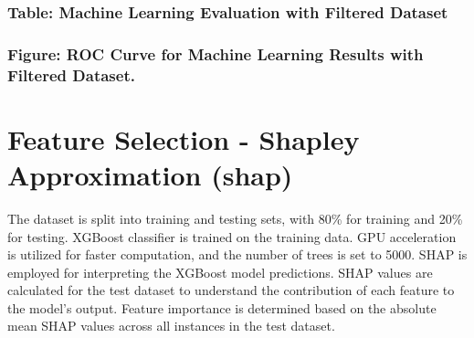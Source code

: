 \documentclass[letterpaper]{article}
\begin{document}
\subsubsection[Table: Machine Learning Evaluation with Filtered Dataset]{\textbf{Table:} Machine Learning Evaluation
with Filtered Dataset}
\centering
{}
\par

\bigskip

\subsubsection[Figure: ROC Curve for Machine Learning Results with Filtered Dataset.]{\textbf{Figure:} ROC Curve for
Machine Learning Results with Filtered Dataset.}

\bigskip


\bigskip


\bigskip


\bigskip


\bigskip


\bigskip

\section[Feature Selection {}- Shapley Approximation (shap)]{\textbf{Feature Selection - Shapley Approximation (shap)}}
The dataset is split into training and testing sets, with 80\% for training and 20\% for testing. XGBoost classifier is
trained on the training data. GPU acceleration is utilized for faster computation, and the number of trees is set to
5000. SHAP is employed for interpreting the XGBoost model predictions. SHAP values are calculated for the test dataset
to understand the contribution of each feature to the model's output. Feature importance is determined based on the
absolute mean SHAP values across all instances in the test dataset.
\end{document}
